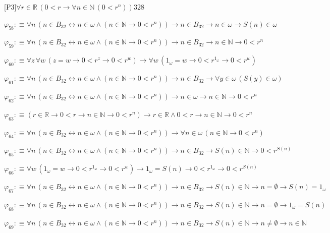 \begin{fullproof}{[P3]}{$\forall r \in \mathbb{R}\,(0 < r \to \forall n \in \mathbb{N}\,(0 < {{r}^{n}}))$}{328}
\begin{abbrevlist}
\item $\varphi_{58} :\equiv \forall n\,(n \in B_{32} \leftrightarrow n \in \omega \land (n \in \mathbb{N} \to 0 < {{r}^{n}})) \to n \in B_{32} \to n \in \omega \to S(n) \in \omega$
\item $\varphi_{59} :\equiv \forall n\,(n \in B_{32} \leftrightarrow n \in \omega \land (n \in \mathbb{N} \to 0 < {{r}^{n}})) \to n \in B_{32} \to n \in \mathbb{N} \to 0 < {{r}^{n}}$
\item $\varphi_{60} :\equiv \forall z\,\forall w\,(z = w \to 0 < {{r}^{z}} \to 0 < {{r}^{w}}) \to \forall w\,(1_{\omega} = w \to 0 < {{r}^{1_{\omega}}} \to 0 < {{r}^{w}})$
\item $\varphi_{61} :\equiv \forall n\,(n \in B_{32} \leftrightarrow n \in \omega \land (n \in \mathbb{N} \to 0 < {{r}^{n}})) \to n \in B_{32} \to \forall y \in \omega\,(S(y) \in \omega)$
\item $\varphi_{62} :\equiv \forall n\,(n \in B_{32} \leftrightarrow n \in \omega \land (n \in \mathbb{N} \to 0 < {{r}^{n}})) \to n \in \omega \to n \in \mathbb{N} \to 0 < {{r}^{n}}$
\item $\varphi_{63} :\equiv (r \in \mathbb{R} \to 0 < r \to n \in \mathbb{N} \to 0 < {{r}^{n}}) \to r \in \mathbb{R} \land 0 < r \to n \in \mathbb{N} \to 0 < {{r}^{n}}$
\item $\varphi_{64} :\equiv \forall n\,(n \in B_{32} \leftrightarrow n \in \omega \land (n \in \mathbb{N} \to 0 < {{r}^{n}})) \to \forall n \in \omega\,(n \in \mathbb{N} \to 0 < {{r}^{n}})$
\item $\varphi_{65} :\equiv \forall n\,(n \in B_{32} \leftrightarrow n \in \omega \land (n \in \mathbb{N} \to 0 < {{r}^{n}})) \to n \in B_{32} \to S(n) \in \mathbb{N} \to 0 < {{r}^{S(n)}}$
\item $\varphi_{66} :\equiv \forall w\,(1_{\omega} = w \to 0 < {{r}^{1_{\omega}}} \to 0 < {{r}^{w}}) \to 1_{\omega} = S(n) \to 0 < {{r}^{1_{\omega}}} \to 0 < {{r}^{S(n)}}$
\item $\varphi_{67} :\equiv \forall n\,(n \in B_{32} \leftrightarrow n \in \omega \land (n \in \mathbb{N} \to 0 < {{r}^{n}})) \to n \in B_{32} \to S(n) \in \mathbb{N} \to n = \emptyset \to S(n) = 1_{\omega}$
\item $\varphi_{68} :\equiv \forall n\,(n \in B_{32} \leftrightarrow n \in \omega \land (n \in \mathbb{N} \to 0 < {{r}^{n}})) \to n \in B_{32} \to S(n) \in \mathbb{N} \to n = \emptyset \to 1_{\omega} = S(n)$
\item $\varphi_{69} :\equiv \forall n\,(n \in B_{32} \leftrightarrow n \in \omega \land (n \in \mathbb{N} \to 0 < {{r}^{n}})) \to n \in B_{32} \to S(n) \in \mathbb{N} \to n \neq \emptyset \to n \in \mathbb{N}$

\end{abbrevlist}
\end{fullproof}
